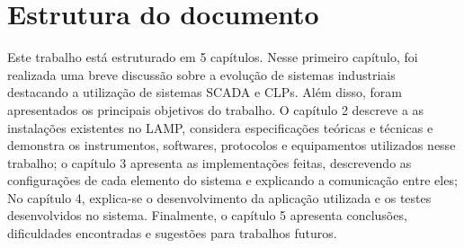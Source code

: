 \section{Estrutura do documento}
Este trabalho está estruturado em 5 capítulos. Nesse primeiro capítulo, foi realizada uma breve discussão sobre a evolução de sistemas industriais destacando a utilização de sistemas SCADA e CLPs. Além disso, foram apresentados os principais objetivos do trabalho. O capítulo 2 descreve a as instalações existentes no LAMP, considera especificações teóricas e técnicas e demonstra os instrumentos, softwares, protocolos e equipamentos utilizados nesse trabalho; o capítulo 3 apresenta as implementações feitas, descrevendo as configurações de cada elemento do sistema e explicando a comunicação entre eles; No capítulo 4, explica-se o desenvolvimento da aplicação utilizada e os testes desenvolvidos no sistema. Finalmente, o capítulo 5 apresenta conclusões, dificuldades encontradas e sugestões para trabalhos futuros.